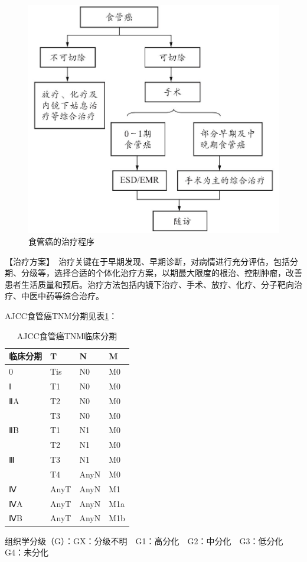 \begin{figure}[!htbp]
 \centering
 \includegraphics{./images/Image00086.jpg}
 \captionsetup{justification=centering}
 \caption{食管癌的治疗程序}
 \label{fig3-1-2}
  \end{figure} 

【治疗方案】　治疗关键在于早期发现、早期诊断，对病情进行充分评估，包括分期、分级等，选择合适的个体化治疗方案，以期最大限度的根治、控制肿瘤，改善患者生活质量和预后。治疗方法包括内镜下治疗、手术、放疗、化疗、分子靶向治疗、中医中药等综合治疗。

AJCC食管癌TNM分期见表\ref{tab3-1-1}：


\begin{table}[htbp]
    \centering
    \caption{AJCC食管癌TNM临床分期}
    \label{tab3-1-1}
    \begin{tabular}{llll}
\toprule
临床分期 & T & N & M\tabularnewline
\midrule
0 & Tis & N0 & M0\tabularnewline
Ⅰ & T1 & N0 & M0\tabularnewline
ⅡA & T2 & N0 & M0\tabularnewline
& T3 & N0 & M0\tabularnewline
ⅡB & T1 & N1 & M0\tabularnewline
& T2 & N1 & M0\tabularnewline
Ⅲ & T3 & N1 & M0\tabularnewline
& T4 & AnyN & M0\tabularnewline
Ⅳ & AnyT & AnyN & M1\tabularnewline
ⅣA & AnyT & AnyN & M1a\tabularnewline
ⅣB & AnyT & AnyN & M1b\tabularnewline
\bottomrule
    \end{tabular}
\end{table}

组织学分级（G）：GX：分级不明　G1：高分化　G2：中分化　G3：低分化　G4：未分化

